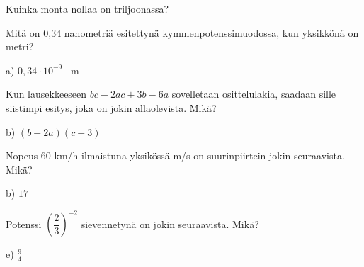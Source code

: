 \begin{tehtava}
Kuinka monta nollaa on triljoonassa?
\begin{alakohdat}
\end{alakohdat}
\end{tehtava}

\begin{tehtava}
Mitä on 0,34 nanometriä esitettynä kymmenpotenssimuodossa, kun yksikkönä on metri?
\begin{alakohdat}
\end{alakohdat}
\begin{vastaus}
a) $0,34 \cdot 10^{-9}$ \, m
\end{vastaus}
\end{tehtava}

\begin{tehtava}
Kun lausekkeeseen $bc-2ac+3b-6a$ sovelletaan osittelulakia, saadaan sille siistimpi esitys, joka on jokin allaolevista. Mikä?
	\begin{alakohdat}
	\end{alakohdat}
    \begin{vastaus}
	b) $(b-2a)(c+3)$
    \end{vastaus}
\end{tehtava}

\begin{tehtava}
Nopeus 60 km/h ilmaistuna yksikössä m/s on suurinpiirtein jokin seuraavista. Mikä?
\begin{alakohdat}
\end{alakohdat}
	\begin{vastaus}
	 b) $17$
	\end{vastaus}
\end{tehtava}

\begin{tehtava}
Potenssi $\left( \dfrac{2}{3} \right)^{-2}$ sievennetynä on jokin seuraavista. Mikä?
\begin{alakohdat}
\end{alakohdat}
\begin{vastaus}
e) $\frac{9}{4}$
\end{vastaus}
\end{tehtava}

